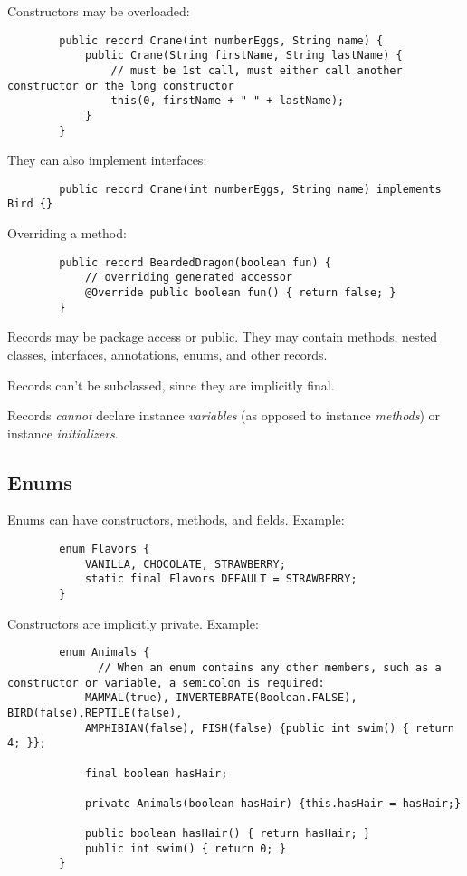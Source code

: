 \documentclass{scrartcl}
\begin{document}
    Constructors may be overloaded:

    \begin{lstlisting}
        public record Crane(int numberEggs, String name) {
            public Crane(String firstName, String lastName) {
                // must be 1st call, must either call another constructor or the long constructor
                this(0, firstName + " " + lastName);
            }
        }
    \end{lstlisting}

    They can also implement interfaces:

    \begin{lstlisting}
        public record Crane(int numberEggs, String name) implements Bird {}
    \end{lstlisting}

    Overriding a method:

     \begin{lstlisting}
        public record BeardedDragon(boolean fun) {
            // overriding generated accessor
            @Override public boolean fun() { return false; }
        }
    \end{lstlisting}

    Records may be package access or public. They may contain methods, nested classes, interfaces, annotations, enums, and other records.

    Records can't be subclassed, since they are implicitly final.

    Records \textit{cannot} declare instance \textit{variables} (as opposed to instance \textit{methods}) or instance \textit{initializers}.

\subsection{Enums}

    Enums can have constructors, methods, and fields. Example:

        \begin{lstlisting}
        enum Flavors {
            VANILLA, CHOCOLATE, STRAWBERRY;
            static final Flavors DEFAULT = STRAWBERRY;
        }
    \end{lstlisting}

    Constructors are implicitly private. Example:

     \begin{lstlisting}
        enum Animals {
              // When an enum contains any other members, such as a constructor or variable, a semicolon is required:
            MAMMAL(true), INVERTEBRATE(Boolean.FALSE), BIRD(false),REPTILE(false),
            AMPHIBIAN(false), FISH(false) {public int swim() { return 4; }};

            final boolean hasHair;

            private Animals(boolean hasHair) {this.hasHair = hasHair;}

            public boolean hasHair() { return hasHair; }
            public int swim() { return 0; }
        }

    \end{lstlisting}
\end{document}
